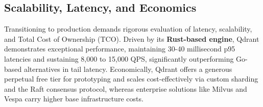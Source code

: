 \begin{table}[H]
    \centering
    \caption{Search Mechanism Comparison}
    \label{tab:search_mechanisms}
\end{table}

\subsection{Scalability, Latency, and Economics}
Transitioning to production demands rigorous evaluation of latency, scalability, and Total Cost of Ownership (TCO). Driven by its \textbf{Rust-based engine}, Qdrant demonstrates exceptional performance, maintaining 30-40 millisecond p95 latencies and sustaining 8,000 to 15,000 QPS, significantly outperforming Go-based alternatives in tail latency. Economically, Qdrant offers a generous perpetual free tier for prototyping and scales cost-effectively via custom sharding and the Raft consensus protocol, whereas enterprise solutions like Milvus and Vespa carry higher base infrastructure costs.

\begin{table}[H]
    \centering
    \caption{Cloud Scalability, Latency, and Economic Efficiency}
    \label{tab:scalability_econ}
\end{table}

